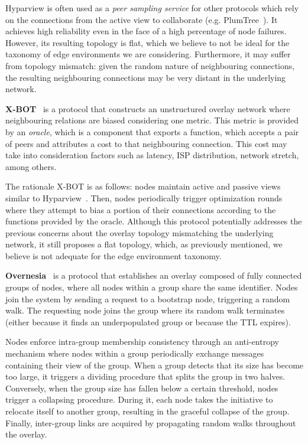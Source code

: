 Hyparview is often used as a \textit{peer sampling service} for other protocols which rely on the connections from the active view to collaborate (e.g. PlumTree~\cite{plumTree}). It achieves high reliability even in the face of a high percentage of node failures. However, its resulting topology is flat, which we believe to not be ideal for the taxonomy of edge environments we are considering. Furthermore, it may suffer from topology mismatch: given the random nature of neighbouring connections, the resulting neighbouring connections may be very distant in the underlying network.

\textbf{X-BOT}~\cite{x-bot} is a protocol that constructs an unstructured overlay network where neighbouring relations are biased considering one metric. This metric is provided by an \textit{oracle}, which is a component that exports a function, which accepts a pair of peers and attributes a cost to that neighbouring connection. This cost may take into consideration factors such as latency, ISP distribution, network stretch, among others. 

The rationale X-BOT is as follows: nodes maintain active and passive views similar to Hyparview~\cite{Hyparview}. Then, nodes periodically trigger optimization rounds where they attempt to bias a portion of their connections according to the functions provided by the oracle. Although this protocol potentially addresses the previous concerns about the overlay topology mismatching the underlying network, it still proposes a flat topology, which, as previously mentioned, we believe is not adequate for the edge environment taxonomy. 

\textbf{Overnesia}~\cite{leitao2014overnesia} is a protocol that establishes an overlay composed of fully connected groups of nodes, where all nodes within a group share the same identifier. Nodes join the system by sending a request to a bootstrap node, triggering a random walk. The requesting node joins the group where its random walk terminates (either because it finds an underpopulated group or because the TTL expires). 

Nodes enforce intra-group membership consistency through an anti-entropy mechanism where nodes within a group periodically exchange messages containing their view of the group. When a group detects that its size has become too large, it triggers a dividing procedure that splits the group in two halves. Conversely, when the group size has fallen below a certain threshold, nodes trigger a collapsing procedure. During it, each node takes the initiative to relocate itself to another group, resulting in the graceful collapse of the group. Finally, inter-group links are acquired by propagating random walks throughout the overlay.

